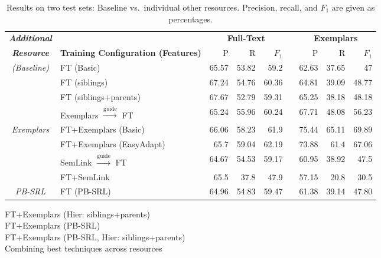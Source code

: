 \begin{table*}\centering\small
\begin{tabular}{>{\itshape}clrrr@{~~}r@{~~}rrr}
\toprule
\normalfont\textbf{Additional} & & \multicolumn{3}{c}{\textbf{Full-Text}} && \multicolumn{3}{c}{\textbf{Exemplars}} \\
\cline{3-5}\cline{7-9}
\normalfont\textbf{Resource} & \textbf{Training Configuration (Features)} & P\hphantom{11} & R\hphantom{11} & $F_1$\hphantom{0} && P\hphantom{11} & R\hphantom{11} & $F_1$\hphantom{0} \\
\midrule
(Baseline) & FT (Basic) & 65.57 & 53.82 & 59.2 && 62.63 & 37.65 & 47 \\
\midrule
\multirow{2}{*}{FN Hierarchy} & FT (siblings) & 67.24 & 54.76 & 60.36 && 64.81 & 39.09 & 48.77 \\
          & FT (siblings+parents) & 67.67 & 52.79 & 59.31 && 65.25 & 38.18 & 48.18 \\
\midrule
& Exemplars $\xrightarrow{\text{guide}}$ FT & 65.24 & 55.96 & 60.24 && 67.71 & 48.08 & 56.23\\
Exemplars & FT+Exemplars (Basic) & 66.06 & 58.23 & 61.9 && 75.44 & 65.11 & 69.89 \\
& FT+Exemplars (EasyAdapt) & 65.7 & 59.04 & 62.19 && 73.88 & 61.4 & 67.06 \\
\midrule
\multirow{2}{*}{SemLink} & SemLink $\xrightarrow{\text{guide}}$ FT & 64.67 & 54.53 & 59.17 && 60.95 & 38.92 & 47.5 \\
& FT+SemLink & 65.5 & 37.8 & 47.9 && 57.15 & 20.8 & 30.5 \\
\midrule
PB-SRL & FT (PB-SRL) & 64.96 & 54.83 & 59.47 && 61.38 & 39.14 & 47.80 \\
\bottomrule
\end{tabular}
\caption{Results on two test sets: Baseline vs.~individual other resources. 
Precision, recall, and $F_1$ are given as percentages.}
\label{tbl:results}
\end{table*}

\begin{table*}\centering\small
FT+Exemplars (Hier: siblings+parents) \\
FT+Exemplars (PB-SRL) \\
FT+Exemplars (PB-SRL, Hier: siblings+parents) \\
\caption{Combining best techniques across resources }
\end{table*}
